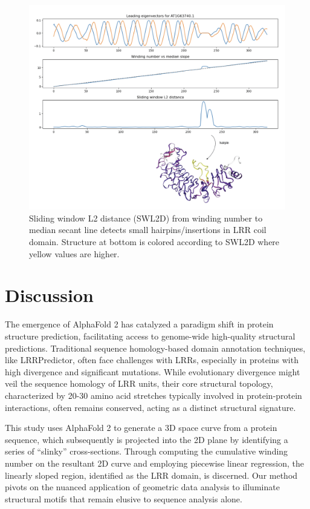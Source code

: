 \documentclass[authoryear]{article}
\begin{document}
\begin{figure}[h!]

 \centering
 \includegraphics[width=1.0\textwidth]{swl2d.png}
 \caption{Sliding window L2 distance (SWL2D) from winding number to median secant line detects small hairpins/insertions in LRR coil domain. Structure at bottom is colored according to SWL2D where yellow values are higher.}
 \label{fig:hairpin}
\end{figure}



\section*{Discussion}

 
The emergence of AlphaFold 2 has catalyzed a paradigm shift in protein structure prediction, facilitating access to genome-wide high-quality structural predictions. Traditional sequence homology-based domain annotation techniques, like LRRPredictor, often face challenges with LRRs, especially in proteins with high divergence and significant mutations. While evolutionary divergence might veil the sequence homology of LRR units, their core structural topology, characterized by 20-30 amino acid stretches typically involved in protein-protein interactions, often remains conserved, acting as a distinct structural signature.

This study uses AlphaFold 2 to generate a 3D space curve from a protein sequence, which subsequently is projected into the 2D plane by identifying a series of “slinky” cross-sections. Through computing the cumulative winding number on the resultant 2D curve and employing piecewise linear regression, the linearly sloped region, identified as the LRR domain, is discerned. Our method pivots on the nuanced application of geometric data analysis to illuminate structural motifs that remain elusive to sequence analysis alone.
\end{document}

